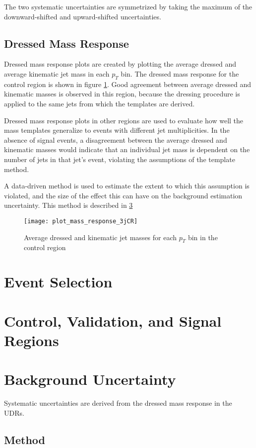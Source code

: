 The two systematic uncertainties are symmetrized by taking the maximum
of the downward-shifted and upward-shifted uncertainties.

\subsection{Dressed Mass Response}
Dressed mass response plots are created by plotting the average
dressed and average kinematic jet mass in each $p_T$ bin. The dressed mass
response for the control region is shown in figure
\ref{fig:response_3jCR}. Good agreement between average dressed and
kinematic masses is observed in this region, because the dressing
procedure is applied to the same jets from which the templates are
derived.

Dressed mass response plots in other regions are used to evaluate how
well the mass templates generalize to events with different jet multiplicities. In the absence of
signal events, a disagreement between the average dressed and
kinematic masses would indicate that an individual jet mass is
dependent on the number of jets in that jet's event, violating
the assumptions of the template method.

A data-driven method is used to estimate the extent to which this
assumption is violated, and the size of the effect this can have on
the background estimation uncertainty. This method is described in
\ref{bkg_uncert}

\begin{figure}[h]
\texttt{[image: plot\_mass\_response\_3jCR]}
\centering
\caption{Average dressed and kinematic jet masses for each $p_T$ bin
  in the control region}
\label{fig:response_3jCR}

\end{figure}


\section{Event Selection}
\section{Control, Validation, and Signal Regions}
\section{Background Uncertainty} \label{bkg_uncert}
Systematic uncertainties are derived from the dressed mass response in
the UDRs.
\subsection{Method}
